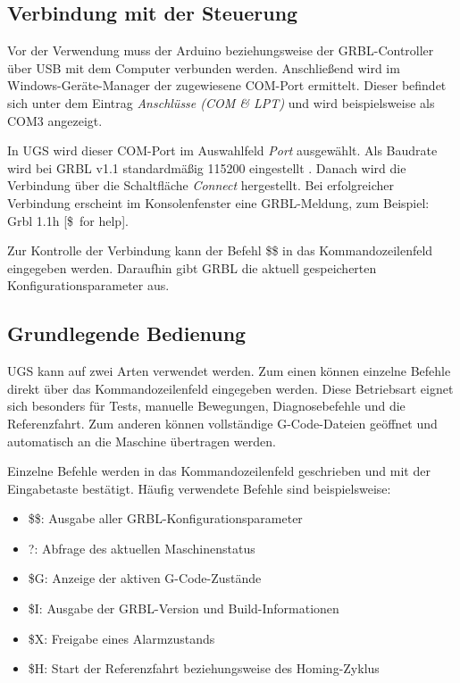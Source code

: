 \subsection{Verbindung mit der Steuerung}

Vor der Verwendung muss der Arduino beziehungsweise der GRBL-Controller über USB mit dem Computer verbunden werden. Anschließend wird im Windows-Geräte-Manager der zugewiesene COM-Port ermittelt. Dieser befindet sich unter dem Eintrag \textit{Anschlüsse (COM \& LPT)} und wird beispielsweise als COM3 angezeigt.

In UGS wird dieser COM-Port im Auswahlfeld \textit{Port} ausgewählt. Als Baudrate wird bei GRBL v1.1 standardmäßig 115200 eingestellt . Danach wird die Verbindung über die Schaltfläche \textit{Connect} hergestellt. Bei erfolgreicher Verbindung erscheint im Konsolenfenster eine GRBL-Meldung, zum Beispiel: Grbl 1.1h [\$\ for help].

Zur Kontrolle der Verbindung kann der Befehl \$\$ in das Kommandozeilenfeld eingegeben werden. Daraufhin gibt GRBL die aktuell gespeicherten Konfigurationsparameter aus.

\subsection{Grundlegende Bedienung}

UGS kann auf zwei Arten verwendet werden. Zum einen können einzelne Befehle direkt über das Kommandozeilenfeld eingegeben werden. Diese Betriebsart eignet sich besonders für Tests, manuelle Bewegungen, Diagnosebefehle und die Referenzfahrt. Zum anderen können vollständige G-Code-Dateien geöffnet und automatisch an die Maschine übertragen werden.

Einzelne Befehle werden in das Kommandozeilenfeld geschrieben und mit der Eingabetaste bestätigt. Häufig verwendete Befehle sind beispielsweise:

\begin{itemize}
	\item \$\$: Ausgabe aller GRBL-Konfigurationsparameter
	\item ?: Abfrage des aktuellen Maschinenstatus
	\item \$G: Anzeige der aktiven G-Code-Zustände
	\item \$I: Ausgabe der GRBL-Version und Build-Informationen
	\item \$X: Freigabe eines Alarmzustands
	\item \$H: Start der Referenzfahrt beziehungsweise des Homing-Zyklus
\end{itemize}

